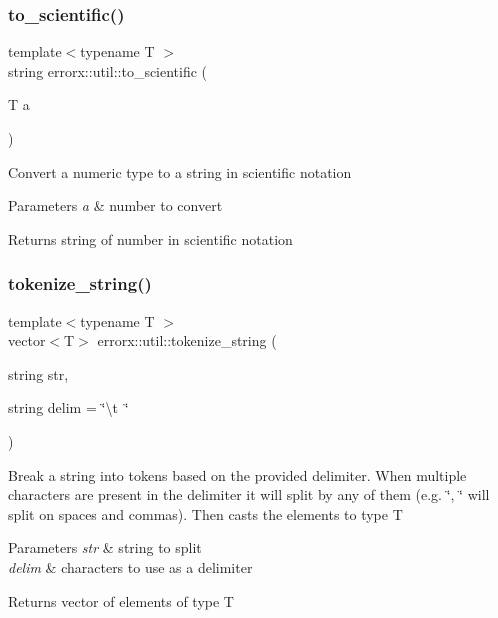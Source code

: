 \subsubsection{\texorpdfstring{to\+\_\+scientific()}{to\_scientific()}}
{\footnotesize\ttfamily template$<$typename T $>$ \\
string errorx\+::util\+::to\+\_\+scientific (\begin{DoxyParamCaption}\item[{T}]{a }\end{DoxyParamCaption})}

Convert a numeric type to a string in scientific notation


\begin{DoxyParams}{Parameters}
{\em a} & number to convert\\
\hline
\end{DoxyParams}
\begin{DoxyReturn}{Returns}
string of number in scientific notation 
\end{DoxyReturn}
\mbox{\label{util_8hh_file_acc497c681cf24c9bff556e8acd63e7e6}} 
\subsubsection{\texorpdfstring{tokenize\+\_\+string()}{tokenize\_string()}}
{\footnotesize\ttfamily template$<$typename T $>$ \\
vector$<$T$>$ errorx\+::util\+::tokenize\+\_\+string (\begin{DoxyParamCaption}\item[{string}]{str,  }\item[{string}]{delim = {\ttfamily \char`\"{}\textbackslash{}t~\char`\"{}} }\end{DoxyParamCaption})}

Break a string into tokens based on the provided delimiter. When multiple characters are present in the delimiter it will split by any of them (e.\+g. \char`\"{}, \char`\"{} will split on spaces and commas). Then casts the elements to type T


\begin{DoxyParams}{Parameters}
{\em str} & string to split \\
\hline
{\em delim} & characters to use as a delimiter\\
\hline
\end{DoxyParams}
\begin{DoxyReturn}{Returns}
vector of elements of type T 
\end{DoxyReturn}
\mbox{\label{util_8hh_file_af1850eec85f3a83033418281ebaefd80}} 

